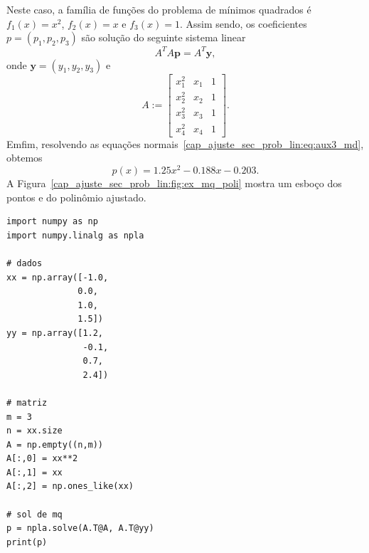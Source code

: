 \begin{ex}
  Neste caso, a família de funções do problema de mínimos quadrados é $f_1(x) = x^2$, $f_2(x) = x$ e $f_3(x) = 1$. Assim sendo, os coeficientes $p = (p_1, p_2, p_3)$ são solução do seguinte sistema linear
  \begin{equation}\label{cap_ajuste_sec_prob_lin:eq:aux3_md}
    A^TA\pmb{p} = A^T\pmb{y},
  \end{equation}
  onde $\pmb{y} = (y_1, y_2, y_3)$ e
  \begin{equation}
    A :=
    \begin{bmatrix}
      x_1^2 & x_1 & 1 \\
      x_2^2 & x_2 & 1 \\
      x_3^2 & x_3 & 1 \\
      x_4^2 & x_4 & 1
    \end{bmatrix}.
  \end{equation}
  Emfim, resolvendo as equações normais~\eqref{cap_ajuste_sec_prob_lin:eq:aux3_md}, obtemos
  \begin{equation}
    p(x) = 1.25x^2 -0.188x - 0.203.
  \end{equation}
  A Figura~\ref{cap_ajuste_sec_prob_lin:fig:ex_mq_poli} mostra um esboço dos pontos e do polinômio ajustado.

\begin{lstlisting}[caption=mqPoli.py]
import numpy as np
import numpy.linalg as npla

# dados
xx = np.array([-1.0,
              0.0,
              1.0,
              1.5])
yy = np.array([1.2,
               -0.1,
               0.7,
               2.4])

# matriz
m = 3
n = xx.size
A = np.empty((n,m))
A[:,0] = xx**2
A[:,1] = xx
A[:,2] = np.ones_like(xx)

# sol de mq
p = npla.solve(A.T@A, A.T@yy)
print(p)
\end{lstlisting}  

\end{ex}



